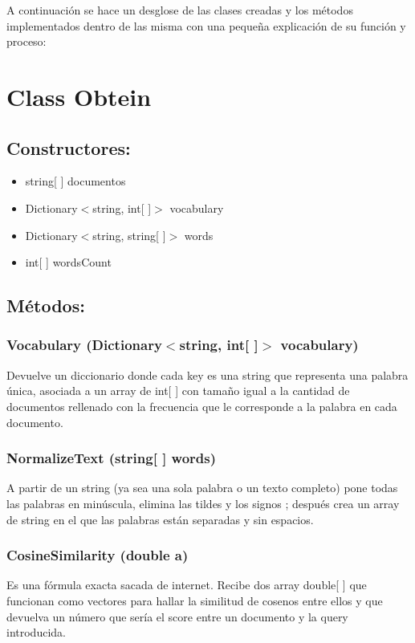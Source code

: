 \documentclass[a4paper,12pt,]{article}
\begin{document}
A continuación se hace un desglose de las clases creadas y los métodos implementados dentro de las misma con 
una pequeña explicación de su función y proceso:

\section*{Class Obtein}

\subsection*{Constructores: }
\begin{itemize}
    \item string[ ]  documentos
    \item Dictionary$<$string, int[ ]$>$ vocabulary
    \item Dictionary$<$string, string[ ]$>$ words
    \item int[ ] wordsCount
\end{itemize}

\subsection*{Métodos:}

\subsubsection*{Vocabulary (Dictionary$<$string, int[ ]$>$ vocabulary)}
Devuelve un diccionario donde cada key es una string que representa una palabra única, asociada a un array de 
int[ ] con tamaño igual a la cantidad de documentos rellenado con la frecuencia que le corresponde a la palabra 
en cada documento.

\subsubsection*{NormalizeText (string[ ] words)}
A partir de un string (ya sea una sola palabra o un texto completo) pone todas las palabras en minúscula, 
elimina las tildes y los signos %
; después crea un array de string en el que las palabras están separadas y sin espacios.

\subsubsection*{CosineSimilarity (double a)}
Es una fórmula exacta sacada de internet.
Recibe dos array double[ ] que funcionan como vectores para hallar la similitud de cosenos entre ellos y que 
devuelva un número que sería el score entre un documento y la query introducida.
\end{document}
